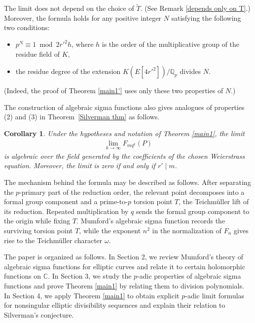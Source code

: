 \documentclass[11pt]{amsart}
\newtheorem{cor}[thm]{Corollary}
\theoremstyle{definition}
\newcommand{\C}{\mathbb{C}}
\begin{document}
The limit does not depend on the choice of $\widetilde{T}$. (See Remark \ref{depends only on T}.) 
Moreover, the formula holds for any positive integer $N$ satisfying the following two conditions:
\begin{itemize}
\item $p^N \equiv 1 \bmod 2r'^2h$, where $h$ is the order of the multiplicative group of the residue field of $K$,
\item the residue degree of the extension $K(E[4r'^2])/\mathbb{Q}_p$ divides $N$.
\end{itemize}
(Indeed, the proof of Theorem \ref{main1'} uses only these two properties of $N$.)

The construction of algebraic sigma functions also gives analogues of
properties (2) and (3) in Theorem~\ref{Silverman thm} as follows.

\begin{cor}\label{cor alg}
Under the hypotheses and notation of Theorem \ref{main1}, the limit 
%
\begin{align*}
\lim_{k\to \infty} F_{mq^k} (P)
\end{align*}
%
is algebraic over the field generated by the coefficients of the chosen Weierstrass equation. 
Moreover, the limit is zero if and only if $r' \mid m$.
\end{cor}

The mechanism behind the formula may be described as follows. 
After separating the $p$-primary part of the reduction order, the relevant point decomposes into a formal group component and a prime-to-$p$ torsion point $T$, the Teichm\"uller lift of its reduction. 
Repeated multiplication by $q$ sends the formal group component to the origin while fixing $T$. 
Mumford's algebraic sigma function records the surviving torsion point $T$,
while the exponent $n^2$ in the normalization of $F_n$ gives rise to the
Teichm\"uller character $\omega$.



The paper is organized as follows. In Section 2, we review Mumford's theory of algebraic sigma functions for elliptic curves and relate it to certain holomorphic functions on $\C$.
In Section 3, we study the $p$-adic properties of algebraic sigma functions and prove Theorem \ref{main1} by relating them to division polynomials. 
In Section 4, we apply Theorem \ref{main1} to obtain explicit $p$-adic limit formulas for nonsingular elliptic divisibility sequences and explain their relation to Silverman's conjecture.
\end{document}
